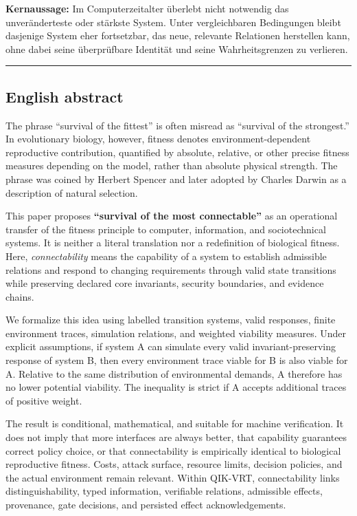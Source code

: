 \documentclass[
  10pt,
  a4paper,
]{article}
\begin{document}
\textbf{Kernaussage:} Im Computerzeitalter überlebt nicht notwendig das
unveränderteste oder stärkste System. Unter vergleichbaren Bedingungen
bleibt dasjenige System eher fortsetzbar, das neue, relevante Relationen
herstellen kann, ohne dabei seine überprüfbare Identität und seine
Wahrheitsgrenzen zu verlieren.

\begin{center}\rule{0.5\linewidth}{0.5pt}\end{center}

\hypertarget{english-abstract}{%
\subsection{English abstract}\label{english-abstract}}

The phrase ``survival of the fittest'' is often misread as ``survival of
the strongest.'' In evolutionary biology, however, fitness denotes
environment-dependent reproductive contribution, quantified by absolute,
relative, or other precise fitness measures depending on the model,
rather than absolute physical strength. The phrase was coined by Herbert
Spencer and later adopted by Charles Darwin as a description of natural
selection.

This paper proposes \textbf{``survival of the most connectable''} as an
operational transfer of the fitness principle to computer, information,
and sociotechnical systems. It is neither a literal translation nor a
redefinition of biological fitness. Here, \emph{connectability} means
the capability of a system to establish admissible relations and respond
to changing requirements through valid state transitions while
preserving declared core invariants, security boundaries, and evidence
chains.

We formalize this idea using labelled transition systems, valid
responses, finite environment traces, simulation relations, and weighted
viability measures. Under explicit assumptions, if system A can simulate
every valid invariant-preserving response of system B, then every
environment trace viable for B is also viable for A. Relative to the
same distribution of environmental demands, A therefore has no lower
potential viability. The inequality is strict if A accepts additional
traces of positive weight.

The result is conditional, mathematical, and suitable for machine
verification. It does not imply that more interfaces are always better,
that capability guarantees correct policy choice, or that connectability
is empirically identical to biological reproductive fitness. Costs,
attack surface, resource limits, decision policies, and the actual
environment remain relevant. Within QIK-VRT, connectability links
distinguishability, typed information, verifiable relations, admissible
effects, provenance, gate decisions, and persisted effect
acknowledgements.
\end{document}
